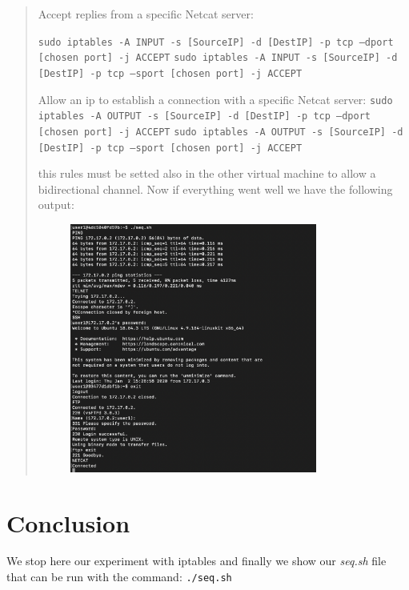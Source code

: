 \documentclass[11pt]{article}
\begin{document}
\begin{quote}
 Accept replies from a specific Netcat server:

 \texttt{sudo iptables -A INPUT -s [SourceIP] -d [DestIP] -p tcp --dport [chosen port] -j ACCEPT}\newline
 \texttt{sudo iptables -A INPUT -s [SourceIP] -d [DestIP] -p tcp --sport [chosen port] -j ACCEPT}\newline

 Allow an ip to establish a connection with a specific Netcat server:
 \texttt{sudo iptables -A OUTPUT -s [SourceIP] -d [DestIP] -p tcp --dport [chosen port] -j ACCEPT}\newline
 \texttt{sudo iptables -A OUTPUT -s [SourceIP] -d [DestIP] -p tcp --sport [chosen port] -j ACCEPT}\newline

 this rules must be setted also in the other virtual machine to allow a bidirectional channel. Now if everything went well we have the following output:

\newpage
 \begin{figure}[!ht]
 \centering
 \includegraphics[width=0.8\textwidth]{pic8-hw8-1635747.png}
 \label{fig:conf}
 \end{figure}
\end{quote}

\section{Conclusion}
We stop here our experiment with iptables and finally we show our {\em seq.sh} file that can be run with the command: \texttt{./seq.sh}
\end{document}
